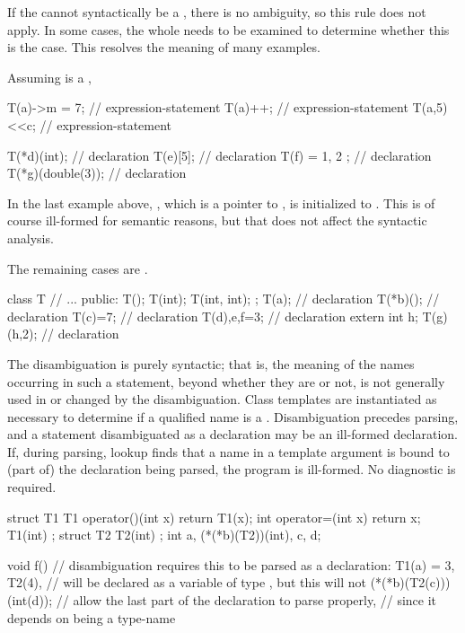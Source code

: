 \pnum
\begin{note}
If the  cannot syntactically be a
, there is no ambiguity,
so this rule does not apply.
In some cases, the whole  needs to be examined
to determine whether this is the case. This resolves the meaning
of many examples.
\begin{example}
Assuming  is a
,

\begin{codeblock}
T(a)->m = 7;        // expression-statement
T(a)++;             // expression-statement
T(a,5)<<c;          // expression-statement

T(*d)(int);         //  declaration
T(e)[5];            //  declaration
T(f) = { 1, 2 };    //  declaration
T(*g)(double(3));   //  declaration
\end{codeblock}

In the last example above, , which is a pointer to ,
is initialized to . This is of course ill-formed for
semantic reasons, but that does not affect the syntactic analysis.
\end{example}

The remaining cases are .
\begin{example}
\begin{codeblock}
class T {
  // ...
public:
  T();
  T(int);
  T(int, int);
};
T(a);               //  declaration
T(*b)();            //  declaration
T(c)=7;             //  declaration
T(d),e,f=3;         //  declaration
extern int h;
T(g)(h,2);          //  declaration
\end{codeblock}
\end{example}
\end{note}

\pnum
The disambiguation is purely syntactic; that is, the meaning of the
names occurring in such a statement, beyond whether they are
 or not, is not generally used in or changed by the
disambiguation. Class templates are instantiated as necessary to
determine if a qualified name is a . Disambiguation
precedes parsing, and a statement disambiguated as a declaration may be
an ill-formed declaration.
If, during parsing, lookup finds
that a name in a template argument is bound to
(part of) the declaration being parsed,
the program is ill-formed.
No diagnostic is required.
\begin{example}
\begin{codeblock}
struct T1 {
  T1 operator()(int x) { return T1(x); }
  int operator=(int x) { return x; }
  T1(int) { }
};
struct T2 { T2(int) { } };
int a, (*(*b)(T2))(int), c, d;

void f() {
  // disambiguation requires this to be parsed as a declaration:
  T1(a) = 3,
  T2(4),                        //  will be declared as a variable of type , but this will not
  (*(*b)(T2(c)))(int(d));       // allow the last part of the declaration to parse properly,
                                // since it depends on  being a type-name
}
\end{codeblock}
\end{example}
